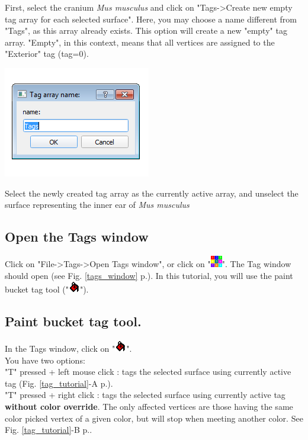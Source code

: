 \documentclass[12pt, a4paper]{book}
\begin{document}
\begin{minipage}{0.5\textwidth}
First, select the cranium \textit{Mus musculus} and click on "Tags->Create new empty tag array for each selected surface". Here, you may choose a name different from "Tags", as this array already exists. This option will create a new "empty" tag array. "Empty", in this context, means that all vertices are assigned to the "Exterior" tag (tag=0).\end{minipage} 
\begin{minipage}{0.5\textwidth}\centering
  \includegraphics[scale=0.5]{../images/12/empty_tag_array.png}
 \end{minipage} 

Select the newly created tag array as the currently active array, and unselect the surface representing the inner ear of \textit{Mus musculus}


\subsection{Open the Tags window}
Click on "File->Tags->Open Tags window", or click on "\includegraphics[scale=0.7]{../images/04/tag_edit.png}". The Tag window should open (see Fig. \ref{tags_window} p.\pageref{tags_window}). In this tutorial, you will use the paint bucket tag tool ("\includegraphics[scale=0.7]{../images/12/paint_bucket.png}"). 

\subsection{Paint bucket tag tool.}
In the Tags window, click on "\includegraphics[scale=0.7]{../images/12/paint_bucket.png}".\\
You have two options:\\
 "T" pressed + left mouse click : tags the selected surface using currently active tag (Fig. \ref{tag_tutorial}-A p.\pageref{tag_tutorial}).\\
"T" pressed + right click : tags the selected surface using currently active tag \textbf{without color override}. The only affected vertices are those having the same color picked vertex of a given color, but will stop when meeting another color. See Fig. \ref{tag_tutorial}-B p.\pageref{tag_tutorial}.
\end{document}

